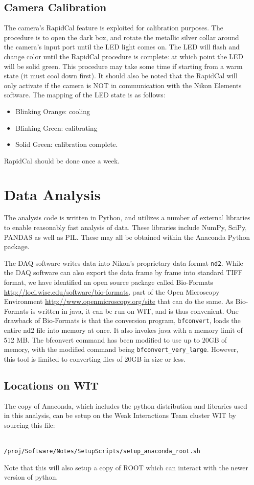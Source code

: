 \documentclass[11pt]{article}
\begin{document}
\subsection{Camera Calibration}
The camera's RapidCal feature is exploited for calibration purposes. The procedure is to open the dark box, and rotate the metallic silver collar around the camera's input port until the LED light comes on.
The LED will flash and change color until the RapidCal procedure is complete: at which point the LED will be solid green. This procedure may take some time if starting from a warm state (it must cool down first).
It should also be noted that the RapidCal will only activate if the camera is NOT in communication with the Nikon Elements software. 
The mapping of the LED state is as follows:
\begin{itemize}
\item Blinking Orange: cooling
\item Blinking Green: calibrating
\item Solid Green: calibration complete. 
\end{itemize}
RapidCal should be done once a week.


\section{Data Analysis} %
The analysis code is written in Python, and utilizes a number of external libraries to enable reasonably fast analysis of data. These libraries include NumPy, SciPy, PANDAS as well as PIL. 
These may all be obtained within the Anaconda Python package. 

The DAQ software writes data into Nikon's proprietary data format \verb+nd2+. While the DAQ software can also export the data frame by frame into standard TIFF format, we have identified an open source package called Bio-Formats \url{http://loci.wisc.edu/software/bio-formats}, part of the Open Microscopy Environment \url{http://www.openmicroscopy.org/site} that can do the same. As Bio-Formats is written in java, it can be run on WIT, and is thus convenient.  
One drawback of Bio-Formats is that the conversion program, \verb+bfconvert+, loads the entire nd2 file into memory at once. It also invokes java with a memory limit of 512 MB. The bfconvert command has been modified to use up to 20GB of memory, with the modified command being \verb+bfconvert_very_large+. However, this tool is limited to converting files of 20GB in size or less.  

\subsection{Locations on WIT}
The copy of Anaconda, which includes the python distribution and libraries used in this analysis, can be setup on the Weak Interactions Team cluster WIT by sourcing this file:
\begin{verbatim}
                /proj/Software/Notes/SetupScripts/setup_anaconda_root.sh
\end{verbatim}
Note that this will also setup a copy of ROOT which can interact with the newer version of python. 
\end{document}

